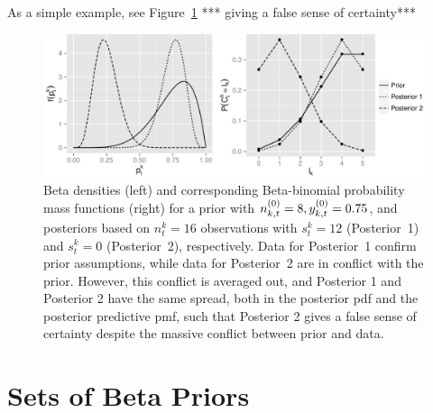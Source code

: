 \documentclass[authoryear, 12pt, a4paper]{elsarticle}
\newcommand{\bebin}{\operatorname{Beta-binomial}}
\newcommand{\td}[1]{%
  \iftoggle{td}{%
    \todo[inline]{#1}%
  }{}%
}
\begin{document}
As a simple example, see Figure~\ref{fig:singleprior-pdc} ***
giving a false sense of certainty***

\begin{figure}
\includegraphics[width=\textwidth]{singleprior-pdc}
\caption{Beta densities (left) and corresponding Beta-binomial probability mass functions (right)
for a prior with $n^{(0)}_{k,t} = 8, y^{(0)}_{k,t} = 0.75$,
and posteriors based on $n^k_t=16$ observations with $s^k_t=12$ (Posterior~1) and $s^k_t=0$ (Posterior~2), respectively.
Data for Posterior~1 confirm prior assumptions,
while data for Posterior~2 are in conflict with the prior.
However, this conflict is averaged out,
and Posterior 1 and Posterior 2 have the same spread, both in the posterior pdf and the posterior predictive pmf,
such that Posterior 2 gives a false sense of certainty despite the massive conflict between prior and data.}
\label{fig:singleprior-pdc}
\end{figure}

 
\td{***Illustration of such prior-data conflict with $\bebin$ distribution:
different priors updated to same posterior,
or same prior updated to different posteriors with same variance,
show corresponding $C^k_t$ distribution.***}



\section{Sets of Beta Priors}
\end{document}
